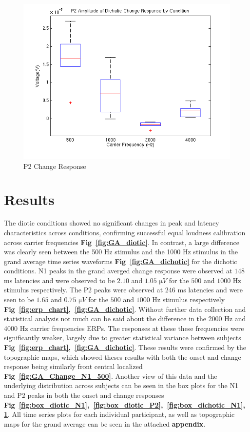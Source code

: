 \documentclass[12pt,journal,compsoc,twocolumn]{IEEEtran}
\begin{document}
\begin{figure}[t]
\centering
\includegraphics[width=3.5 in]{box_dichotic_P2}
\caption{P2 Change Response}
\label{fig:box_dichotic_P2}
\end{figure}
\section{Results}
The diotic conditions showed no significant changes in peak and latency characteristics across conditions, confirming successful equal loudness calibration across carrier frequencies \textbf{Fig~\ref{fig:GA_diotic}}.   In contrast, a large difference was clearly seen between the 500 Hz stimulus and the 1000 Hz stimulus in the grand average time series waveforms \textbf{Fig~\ref{fig:GA_dichotic}} for the dichotic conditions.  N1 peaks in the grand averged change response were observed at $148$ ms latencies and were observed to be $2.10$ and $1.05$ $\si{\micro} V$  for the $500$ and $1000$ Hz stimulus respectively. The P2 peaks were observed at $246$ ms latencies and were seen to be $1.65$ and $0.75$ $\si{\micro} V$  for the $500$ and $1000$ Hz stimulus respectively \textbf{Fig~\ref{fig:erp_chart}}\textbf{,~\ref{fig:GA_dichotic}}. Without further data collection and statistical analysis not much can be said about the difference in the 2000 Hz and 4000 Hz carrier frequencies ERPs.  The responses at these these frequencies were significantly weaker, largely due to greater statistical variance between subjects \textbf{Fig~\ref{fig:erp_chart}}\textbf{,~\ref{fig:GA_dichotic}}.  These results were confirmed by the topographic maps, which showed theses results with both the onset and change response being similarly front central localized \textbf{Fig~\ref{fig:GA_Change_N1_500}}.   Another view of this data and the underlying distribution across subjects can be seen in the box plots for the N1 and P2 peaks in both the onset and change responses \textbf{Fig~\ref{fig:box_diotic_N1}}\textbf{,~\ref{fig:box_diotic_P2}}\textbf{,~\ref{fig:box_dichotic_N1}}\textbf{,~\ref{fig:box_dichotic_P2}}.  All time series plots for each individual participant, as well as topographic maps for the grand average  can be seen in the attached \textbf{appendix}. 
\end{document}
